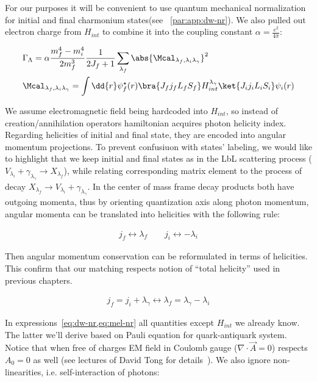 For our purposes it will be convenient to use quantum mechanical normalization for initial and final charmonium states(see ~\cref{par:app:dw-nr}). We also pulled out electron charge from $H_{int}$ to combine it into the coupling constant $\alpha = \frac{e^2}{4 \pi}$: 

\begin{align}
    &\Gamma_{\Lambda} = \alpha \frac{m_f^4 - m_i^4}{2 m_f^3} \frac{1}{2J_f + 1} \sum_{\lambda_f} \abs{\Mcal_{\lambda_f, \lambda_i \lambda_\gamma}}^2 \label{eq:dw-nr} \\
    &\Mcal_{\lambda_f, \lambda_i \lambda_\gamma} = \int \dd{r} \psi_f^\star(r) \bra{J_f j_f L_f S_f} H_{int}^{\lambda_\gamma} \ket{J_i j_i L_i S_i} \psi_i(r) \label{eq:mel-nr}
\end{align}

We assume electromagnetic field being hardcoded into $H_{int}$, so instead of creation/annihilation operators hamiltonian acquires photon helicity index. Regarding helicities of initial and final state, they are encoded into angular momentum projections. To prevent confusiuon with states' labeling, we would like to highlight that we keep initial and final states as in the LbL scattering process ($V_{\lambda_i} + \gamma_{\lambda_\gamma} \rightarrow X_{\lambda_f}$), while relating corresponding matrix element to the process of decay $X_{\lambda_f} \rightarrow V_{\lambda_i} + \gamma_{\lambda_\gamma}$. In the center of mass frame decay products both have outgoing momenta, thus by orienting quantization axis along photon momentum, angular momenta can be translated into helicities with the following rule:

\begin{align}
    j_f \leftrightarrow \lambda_f \qquad j_i \leftrightarrow -\lambda_i
\end{align}

Then angular momentum conservation can be reformulated in terms of helicities. This confirm that our matching respects notion of ``total helicity'' used in previous chapters.

\begin{align}
    j_f = j_i + \lambda_\gamma \leftrightarrow \lambda_f = \lambda_\gamma - \lambda_i
\end{align}

In expressions~\cref{eq:dw-nr,eq:mel-nr} all quantities except $H_{int}$ we already know. The latter we'll derive based on Pauli equation for quark-antiquark system. Notice that when free of charges EM field in Coulomb gauge ($\nabla\cdot\vec{A} = 0$) respects $A_0 = 0$ as well (see lectures of David Tong for details~\cite{tong-qed}). We also ignore non-linearities, i.e. self-interaction of photons:

